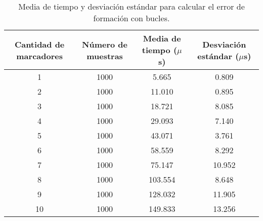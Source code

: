 \begin{table}[H]
	\centering
	\resizebox{\textwidth}{!} {
	\begin{tabular}{|c|c|c|c|}
		\hline
		\textbf{Cantidad de marcadores} & \textbf{Número de muestras} & \textbf{Media de tiempo ($\mu$s)} & \textbf{Desviación estándar ($\mu$s)} \\ \hline
		1                               & 1000                        & 5.665                         & 0.809                             \\ \hline
		2                               & 1000                        & 11.010                        & 0.895                             \\ \hline
		3                               & 1000                        & 18.721                        & 8.085                             \\ \hline
		4                               & 1000                        & 29.093                        & 7.140                             \\ \hline
		5                               & 1000                        & 43.071                        & 3.761                             \\ \hline
		6                               & 1000                        & 58.559                        & 8.292                             \\ \hline
		7                               & 1000                        & 75.147                        & 10.952                            \\ \hline
		8                               & 1000                        & 103.554                       & 8.648                             \\ \hline
		9                               & 1000                        & 128.032                       & 11.905                            \\ \hline
		10                              & 1000                        & 149.833                       & 13.256                            \\ \hline
	\end{tabular}}
	\caption{Media de tiempo y desviación estándar para calcular el error de formación con bucles.}
	\label{cuadro:tiempos_error_for}
\end{table}

